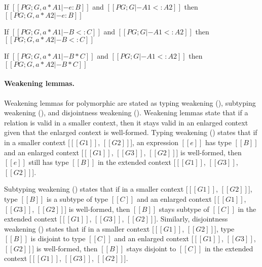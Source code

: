\begin{lemma}\label{lemma:typ:rev:poly:narrow}
  If $[[PG ; G , a * A1 |- e : B]]$ and $[[PG ; G |- A1 <: A2]]$
  then $[[PG ; G , a * A2 |- e : B]]$
\end{lemma}

\begin{lemma}\label{lemma:sub:rev:poly:narrow}
  If $[[PG ; G , a * A1 |- B <: C]]$ and $[[PG ; G |- A1 <: A2]]$
  then $[[PG ; G , a * A2 |- B <: C]]$
\end{lemma}

\begin{lemma}\label{lemma:disj:rev:poly:narrow}
  If $[[PG ; G , a * A1 |- B * C]]$ and $[[PG ; G |- A1 <: A2]]$
  then $[[PG ; G , a * A2 |- B * C]]$
\end{lemma}

\paragraph{Weakening lemmas.}
Weakening lemmas for polymorphic \name are stated as
typing weakening (), 
subtyping weakening (), 
and disjointness weakening ().
Weakening lemmas state that if a relation is valid in a smaller
context, then it stays valid in an enlarged context given
that the enlarged context is well-formed.
Typing weakening () states that
if in a smaller context [$[[G1]]$, $[[G2]]$],
an expression $[[e]]$ has type $[[B]]$ and an
enlarged context
[$[[G1]]$, $[[G3]]$, $[[G2]]$] is well-formed, then
$[[e]]$ still has type $[[B]]$ in the extended context
[$[[G1]]$, $[[G3]]$, $[[G2]]$].

Subtyping weakening () states that
if in a smaller context [$[[G1]]$, $[[G2]]$],
type $[[B]]$ is a subtype of type $[[C]]$ and
an enlarged context
[$[[G1]]$, $[[G3]]$, $[[G2]]$] is well-formed, then
$[[B]]$ stays subtype of $[[C]]$ in the extended context
[$[[G1]]$, $[[G3]]$, $[[G2]]$].
Similarly, disjointness weakening 
()
states that
if in a smaller context [$[[G1]]$, $[[G2]]$],
type $[[B]]$ is disjoint to type $[[C]]$ and an enlarged context
[$[[G1]]$, $[[G3]]$, $[[G2]]$] is well-formed, then
$[[B]]$ stays disjoint to $[[C]]$ in the extended context
[$[[G1]]$, $[[G3]]$, $[[G2]]$].

